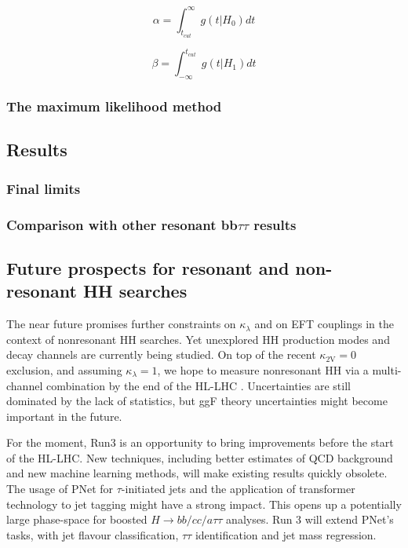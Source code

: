 \documentclass[11pt]{article}
\newcommand{\kl}{\kappa_{\lambda}}
\newcommand{\kvv}{\kappa_{\text{2V}}}
\newcommand{\bbtt}{bb$\tau\tau$}
\begin{document}
\begin{equation}
\label{eq:significance_level}
\alpha = \int_{t_{cut}}^{\infty} g(t|H_{0})dt
\end{equation}

\begin{equation}
\label{eq:inverse_power}
\beta = \int_{-\infty}^{t_{cut}} g(t|H_{1})dt
\end{equation}




\cite{glen_cowan}
\subsubsection{The maximum likelihood method}
\label{sec:org7e0b38a}
\subsection{Results}
\label{sec:org33b36d6}
\subsubsection{Final limits}
\label{sec:orgfa3953f}
\subsubsection{Comparison with other resonant \bbtt{} results}
\label{sec:org1624a63}
\subsection{Future prospects for resonant and non-resonant HH searches}
\label{sec:orgbbdfdc6}
\label{sec::future}

The near future promises further constraints on \(\kl\) and on \ac{EFT} couplings in the context of nonresonant HH searches.
Yet unexplored HH production modes and decay channels are currently being studied.
On top of the recent \(\kvv=0\) exclusion, and assuming \(\kl=1\), we hope to measure nonresonant HH via a multi-channel combination by the end of the \ac{HL-LHC} \cite{higgs_10_years}.
Uncertainties are still dominated by the lack of statistics, but \ac{ggF} theory uncertainties might become important in the future.

For the moment, Run3 is an opportunity to bring improvements before the start of the \ac{HL-LHC}.
New techniques, including better estimates of \ac{QCD} background and new machine learning methods, will make existing results quickly obsolete.
The usage of \ac{PNet} \cite{particle_net} for \(\tau\)-initiated jets and the application of transformer technology to jet tagging \cite{particle_transformer} might have a strong impact.
This opens up a potentially large phase-space for boosted \(H\rightarrow bb/cc/a\tau\tau\) analyses.
Run 3 will extend \ac{PNet}'s tasks, with jet flavour classification, \(\tau\tau\) identification and jet mass regression.
\end{document}

